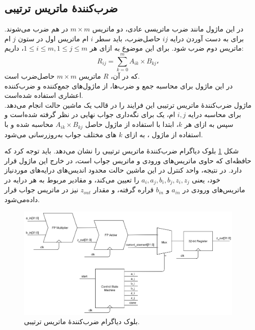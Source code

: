 \documentclass[conference]{IEEEtran-ModifiedForMVIP}
\begin{document}
\subsection{
    ضرب‌کنندهٔ ماتریس ترتیبی
}

در این ماژول مانند ضرب ماتریسی عادی، دو ماتریس 
$m \times m$
در هم ضرب می‌شوند. برای به دست آوردن درایه 
$ij$
حاصل‌ضرب، باید سطر
$i$
ام ماتریس اول در ستون
$j$
ام ماتریس دوم ضرب شود. برای این موضوع به ازای هر 
$1\leq i\leq m , 1\leq j\leq m $،
داریم:
$$R_{ij} = \sum_{k=0}^m{A_{ik} \times B_{kj}}،$$
که در آن،
$R$
ماتریس
$m \times m$
حاصل‌ضرب است.\\
در این ماژول برای محاسبه جمع و ضرب‌ها، از ماژول‌های جمع‌کننده و ضرب‌کننده اعشاری
استفاده شده‌است.\\
ماژول ضرب‌کنندهٔ ماتریس ترتیبی
 این فرایند را در قالب یک ماشین حالت انجام می‌دهد. برای محاسبه درایه $i,j$ ام، یک 
 برای نگه‌داری جواب نهایی در نظر گرفته شده‌است و سپس
  به ازای هر $k$، ابتدا با استفاده از ماژول 
  حاصل
$A_{ik}\times B_{kj}$
محاسبه شده و با استفاده از ماژول
 ، به ازای $k$ های مختلف جواب به‌روزرسانی می‌شود.  

شکل
\ref{fig:SequentialBD}
بلوک دیاگرام ضرب‌کنندهٔ ماتریس ترتیبی را نشان می‌دهد.
باید توجه کرد که حافظه‌ای که حاوی ماتریس‌های ورودی و ماتریس جواب است، در خارج این ماژول قرار دارد.
در نتیجه، واحد کنترل در این ماشین حالت محدود
اندیس‌های درایه‌های موردنیاز خود، یعنی
$a_i, a_j, b_i, b_j, z_i, z_j$
را تعیین می‌کند، و مقادیر مربوط به هر درایه در ماتریس‌های ورودی در
$a_{in}$
و
$b_{in}$
قراره گرفته، و مقدار
$z_{out}$
نیز در ماتریس جواب قرار داده‌می‌شود.


\begin{figure}[t]
\centering 
\includegraphics[width=1\linewidth]{Images/SequentialBD.png}
\caption{
\centering
بلوک دیاگرام ضرب‌کنندهٔ ماتریس ترتیبی.
}\label{fig:SequentialBD}
\end{figure}
\end{document}
